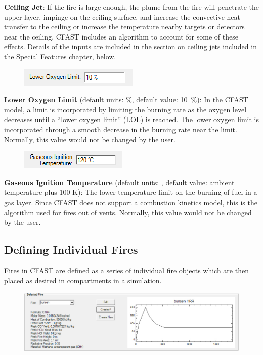 \textbf{Ceiling Jet}: If the fire is large enough, the plume from the fire will penetrate the upper layer, impinge on the ceiling surface, and increase the convective heat transfer to the ceiling or increase the temperature nearby targets or detectors near the ceiling.  CFAST includes an algorithm to account for some of these effects.  Details of the inputs are included in the section on ceiling jets included in the Special Features chapter, below.

\begin{figure}
  \includegraphics[width=2.240in]{FIGURES/Input_File/LOL}
\end{figure}

\textbf{Lower Oxygen Limit} (default units: \%, default value: 10~\%):  In the CFAST model, a limit is incorporated by limiting the burning rate as the oxygen level decreases until a ``lower oxygen limit'' (LOL) is reached. The lower oxygen limit is incorporated through a smooth decrease in the burning rate near the limit. Normally, this value would not be changed by the user.

\begin{figure}
  \includegraphics[width=2.021in]{FIGURES/Input_File/Gaseous_Ignition_Temperature}
\end{figure}

\textbf{Gaseous Ignition Temperature} (default units: \degc, default value: ambient temperature plus 100 K): The lower temperature limit on the burning of fuel in a gas layer. Since CFAST does not support a combustion kinetics model, this is the algorithm used for fires out of vents.  Normally, this value would not be changed by the user.

\subsection{Defining Individual Fires}

Fires in CFAST are defined as a series of individual fire objects which are then placed as desired in compartments in a simulation.

\begin{figure}[h!]
\begin{center}
\includegraphics[width=6.5in]{FIGURES/Input_File/Fire_Object_Plot}
\end{center}
\end{figure}

